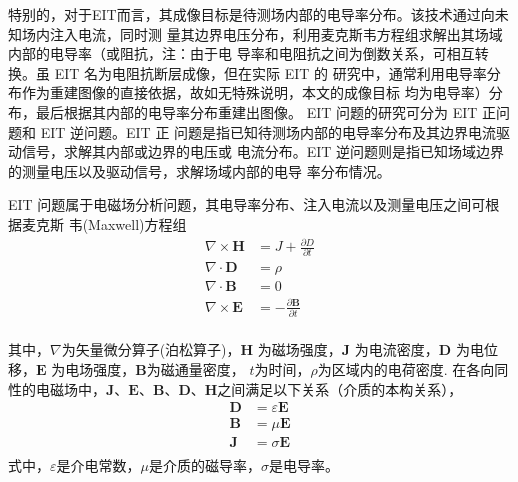 特别的，对于EIT而言，其成像目标是待测场内部的电导率分布。该技术通过向未知场内注入电流，同时测
量其边界电压分布，利用麦克斯韦方程组求解出其场域内部的电导率（或阻抗，注：由于电
导率和电阻抗之间为倒数关系，可相互转换。虽 EIT 名为电阻抗断层成像，但在实际 EIT 的
研究中，通常利用电导率分布作为重建图像的直接依据，故如无特殊说明，本文的成像目标
均为电导率）分布，最后根据其内部的电导率分布重建出图像。
EIT 问题的研究可分为 EIT 正问题和 EIT 逆问题。EIT 正
问题是指已知待测场内部的电导率分布及其边界电流驱动信号，求解其内部或边界的电压或
电流分布。EIT 逆问题则是指已知场域边界的测量电压以及驱动信号，求解场域内部的电导
率分布情况。

EIT 问题属于电磁场分析问题，其电导率分布、注入电流以及测量电压之间可根据麦克斯
韦(Maxwell)方程组
\begin{equation}
\label{equation:Maxwell}
    \begin{aligned}
        \nabla \times \boldsymbol{H} &= J + \frac{\partial{D}}{\partial{t}} \\
        \nabla \cdot \boldsymbol{D} &= \rho \\
        \nabla \cdot \boldsymbol{B} &= 0 \\
        \nabla \times\boldsymbol{E} &= -\frac{\partial \boldsymbol{B}}{\partial t} \\   
    \end{aligned}
\end{equation}

其中，$\nabla$为矢量微分算子(泊松算子)，$\boldsymbol{H}$ 为磁场强度，$\boldsymbol{J}$ 为电流密度，$\boldsymbol{D}$
为电位移，$\boldsymbol{E}$ 为电场强度，$\boldsymbol{B}$为磁通量密度， $t$为时间，$\rho$为区域内的电荷密度.
在各向同性的电磁场中，$\boldsymbol{J}$、$\boldsymbol{E}$、$\boldsymbol{B}$、$\boldsymbol{D}$、$\boldsymbol{H}$之间满足以下关系（介质的本构关系），
\begin{equation}
  \label{equation:Maxwell_relation}
  \begin{aligned}
    \boldsymbol{D} &= \varepsilon\boldsymbol{E}\\
    \boldsymbol{B} & = \mu\boldsymbol{E}\\
    \boldsymbol{J} & = \sigma\boldsymbol{E}\\
  \end{aligned}
\end{equation}
式中，$\varepsilon$是介电常数，$\mu$是介质的磁导率，$\sigma$是电导率。

